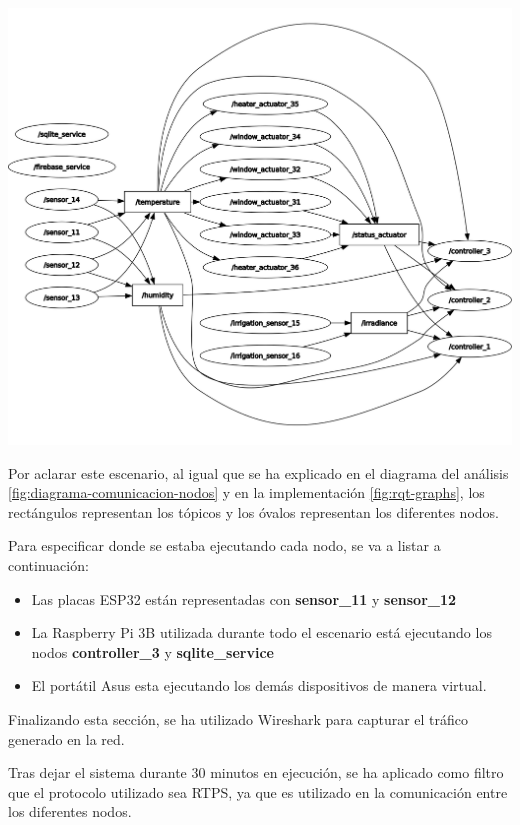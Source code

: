 \begin{center}
    \centering
    \includegraphics[width=\textwidth]{img/09-Escenario-3-rosgraph.png}
    \label{fig:rqt-escenario-3}
\end{center}

Por aclarar este escenario, al igual que se ha explicado en el diagrama del análisis \ref{fig:diagrama-comunicacion-nodos} y en la implementación \ref{fig:rqt-graphs}, los rectángulos representan los tópicos y los óvalos representan los diferentes nodos.

Para especificar donde se estaba ejecutando cada nodo, se va a listar a continuación:

\begin{itemize}
    \item Las placas ESP32 están representadas con \textbf{sensor\_11} y \textbf{sensor\_12}
    \item La Raspberry Pi 3B utilizada durante todo el escenario está ejecutando los nodos \textbf{controller\_3} y \textbf{sqlite\_service}
    \item El portátil Asus esta ejecutando los demás dispositivos de manera virtual.
\end{itemize}

Finalizando esta sección, se ha utilizado Wireshark \cite{wireshark} para capturar el tráfico generado en la red. 

Tras dejar el sistema durante 30 minutos en ejecución, se ha aplicado como filtro que el protocolo utilizado sea RTPS, ya que es utilizado en la comunicación entre los diferentes nodos.

